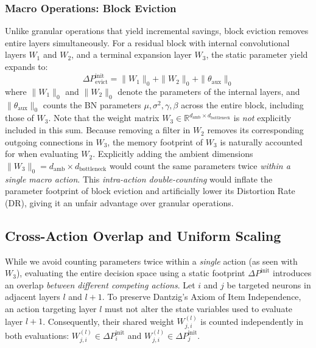 \documentclass[11pt, a4paper, copyright, gdm]{google}
\newcommand{\R}{\mathbb{R}}
\theoremstyle{definition}
\begin{document}
\subsubsection{Macro Operations: Block Eviction}
Unlike granular operations that yield incremental savings, block eviction removes entire layers simultaneously. For a residual block with internal convolutional layers $W_1$ and $W_2$, and a terminal expansion layer $W_3$, the static parameter yield expands to:
\begin{equation}
    \Delta P_{\text{evict}}^{\text{init}} = \|W_1\|_0 + \|W_2\|_0 + \|\theta_{\text{aux}}\|_0
\end{equation}
where $\|W_1\|_0$ and $\|W_2\|_0$ denote the parameters of the internal layers, and $\|\theta_{\text{aux}}\|_0$ counts the BN parameters $\mu, \sigma^2, \gamma, \beta$ across the entire block, including those of $W_3$. Note that the weight matrix $W_3 \in \R^{d_{\text{amb}} \times d_{\text{bottleneck}}}$ is \textit{not} explicitly included in this sum. Because removing a filter in $W_2$ removes its corresponding outgoing connections in $W_3$, the memory footprint of $W_3$ is naturally accounted for when evaluating $W_2$. Explicitly adding the ambient dimensions $\|W_3\|_0 = d_{\text{amb}} \times d_{\text{bottleneck}}$ would count the same parameters twice \textit{within a single macro action}. This \textit{intra-action double-counting} would inflate the parameter footprint of block eviction and artificially lower its Distortion Rate (DR), giving it an unfair advantage over granular operations.


\subsection{Cross-Action Overlap and Uniform Scaling}
\label{sec:appendix_double_counting}

While we avoid counting parameters twice within a \textit{single} action (as seen with $W_3$), evaluating the entire decision space using a static footprint $\Delta P^{\text{init}}$ introduces an overlap \textit{between different competing actions}. Let $i$ and $j$ be targeted neurons in adjacent layers $l$ and $l+1$. To preserve Dantzig's Axiom of Item Independence, an action targeting layer $l$ must not alter the state variables used to evaluate layer $l+1$. Consequently, their shared weight $W^{(l)}_{j,i}$ is counted independently in both evaluations: $W^{(l)}_{j,i} \in \Delta P_i^{\text{init}}$ and $W^{(l)}_{j,i} \in \Delta P_j^{\text{init}}$.
\end{document}
